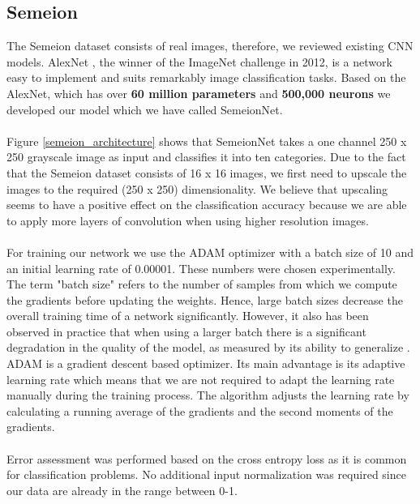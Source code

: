 \documentclass[a4paper, 11pt, twoside, openright]{article}
\begin{document}
\subsection{Semeion}

The Semeion dataset consists of real images, therefore, we reviewed existing CNN models. AlexNet \cite{Krizhevsky:2012:ICD:2999134.2999257}, the winner of the ImageNet challenge in 2012, is a network easy to implement and suits remarkably image classification tasks. Based on the AlexNet, which has over \textbf{60 million parameters} and \textbf{500,000 neurons} we developed our model which we have called SemeionNet.
\\ \\
Figure \ref{semeion_architecture} shows that SemeionNet takes a one channel 250 x 250 grayscale image as input and classifies it into ten categories. Due to the fact that the Semeion dataset consists of 16 x 16 images, we first need to upscale the images to the required (250 x 250) dimensionality. We believe that upscaling seems to have a positive effect on the classification accuracy because we are able to apply more layers of convolution when using higher resolution images.
\\ \\
For training our network we use the ADAM \cite{DBLP:journals/corr/KingmaB14} optimizer with a batch size of 10 and an initial learning rate of 0.00001. These numbers were chosen experimentally. \\ The term "batch size" refers to the number of samples from which we compute the gradients before updating the weights. Hence, large batch sizes decrease the overall training time of a network significantly. However, it also has been observed in practice that when using a larger batch there is a significant degradation in the quality of the model, as measured by its ability to generalize \cite{DBLP:journals/corr/KeskarMNST16}. \\
ADAM is a gradient descent based optimizer. Its main advantage is its adaptive learning rate which means that we are not required to adapt the learning rate manually during the training process. The algorithm adjusts the learning rate by calculating a running average of the gradients and the second moments of the gradients. \\ \\
Error assessment was performed based on the cross entropy loss as it is common for classification problems. No additional input normalization was required since our data are already in the range between 0-1.
\end{document}
